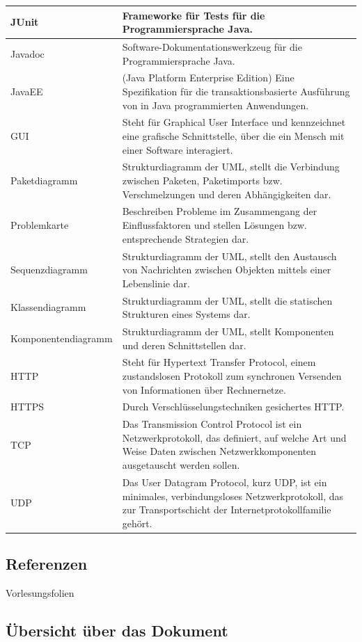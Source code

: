 \documentclass[fontsize=12pt,paper=a4,twoside]{scrartcl}
\begin{document}
\begin{longtable}{ |  l | p{12cm} |}
JUnit & Frameworke für Tests für die Programmiersprache Java.\\     \hline
Javadoc  &Software-Dokumentationswerkzeug für die Programmiersprache Java. \\     \hline
JavaEE &(Java Platform Enterprise Edition) Eine Spezifikation für die transaktionsbasierte 
Ausführung von in Java programmierten Anwendungen.\\    \hline
GUI &Steht für Graphical User Interface und kennzeichnet
eine grafische Schnittstelle, über die ein Mensch mit
einer Software interagiert.\\ \hline
Paketdiagramm &Strukturdiagramm der UML, stellt die Verbindung
zwischen Paketen, Paketimports bzw. Verschmelzungen
und deren Abhängigkeiten dar. \\ \hline
Problemkarte &Beschreiben Probleme im Zusammengang der Einflussfaktoren
und stellen Lösungen bzw. entsprechende
Strategien dar. \\ \hline
Sequenzdiagramm &Strukturdiagramm der UML, stellt den Austausch
von Nachrichten zwischen Objekten mittels einer Lebenslinie
dar. \\ \hline
Klassendiagramm &Strukturdiagramm der UML, stellt die statischen
Strukturen eines Systems dar.\\ \hline
Komponentendiagramm &Strukturdiagramm der UML, stellt Komponenten
und deren Schnittstellen dar. \\ \hline
HTTP &Steht für Hypertext Transfer Protocol, einem zustandslosen
Protokoll zum synchronen Versenden von
Informationen über Rechnernetze.\\ \hline
HTTPS &Durch Verschlüsselungstechniken gesichertes HTTP. \\ \hline
TCP &Das Transmission Control Protocol ist ein Netzwerkprotokoll, das definiert, auf welche Art und Weise
 Daten zwischen Netzwerkkomponenten ausgetauscht werden sollen. \\ \hline
UDP &Das User Datagram Protocol, kurz UDP, ist ein minimales, verbindungsloses Netzwerkprotokoll, 
das zur Transportschicht der Internetprotokollfamilie gehört.\\ \hline
   

 \end{longtable}

\subsection{Referenzen}
Vorlesungsfolien


\subsection{Übersicht über das Dokument}
\end{document}
